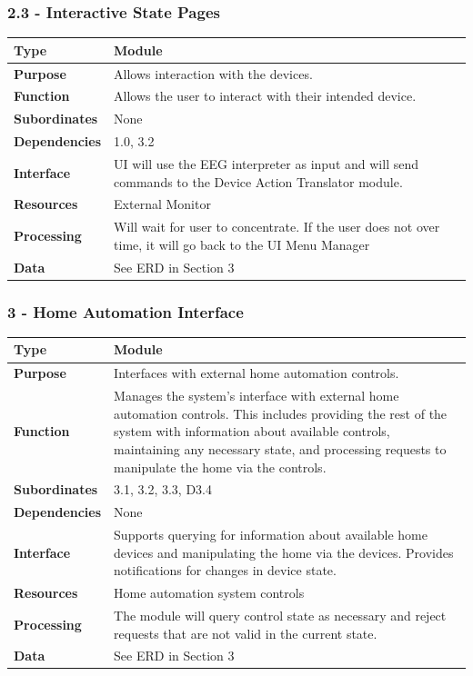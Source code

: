 \documentclass{article}
\begin{document}
\subsubsection*{2.3 - Interactive State Pages}
\begin{tabular}{ | l |  p{13.3cm} |}
\hline
\textbf{Type} & Module \\ \hline
\textbf{Purpose} & Allows interaction with the devices. \\ \hline
\textbf{Function} & Allows the user to interact with their intended device. \\ \hline
\textbf{Subordinates} & None \\ \hline
\textbf{Dependencies} & 1.0, 3.2 \\ \hline
\textbf{Interface} & UI will use the EEG interpreter as input and will send commands to the Device Action Translator module.  \\ \hline
\textbf{Resources} & External Monitor \\ \hline
\textbf{Processing} & Will wait for user to concentrate. If the user does not over time, it will go back to the UI Menu Manager \\ \hline
\textbf{Data} & See ERD in Section 3 \\ \hline
\end{tabular}

\subsubsection*{3 - Home Automation Interface}
\begin{tabular}{ | l |  p{13.3cm} |}
\hline
\textbf{Type} & Module \\ \hline
\textbf{Purpose} & Interfaces with external home automation controls. \\ \hline
\textbf{Function} & Manages the system's interface with external home
automation controls. This includes providing the rest of the system with
information about available controls, maintaining any necessary state, and
processing requests to manipulate the home via the controls. \\ \hline
\textbf{Subordinates} & 3.1, 3.2, 3.3, D3.4 \\ \hline
\textbf{Dependencies} & None \\ \hline
\textbf{Interface} & Supports querying for information about available home
devices and manipulating the home via the devices. Provides notifications for
changes in device state. \\ \hline
\textbf{Resources} & Home automation system controls \\ \hline
\textbf{Processing} & The module will query control state as necessary and
reject requests that are not valid in the current state. \\ \hline
\textbf{Data} & See ERD in Section 3 \\ \hline
\end{tabular}
\end{document}
